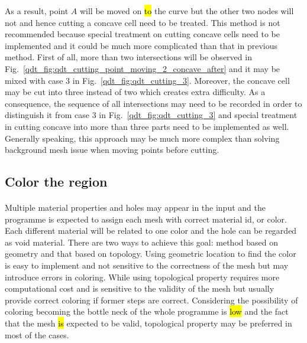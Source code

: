 As a result, point $A$ will be moved on \hl{to} the curve but the other two nodes will not and hence cutting a concave cell need to be treated.
This method is not recommended because special treatment on cutting concave cells need to be implemented and it could be much more complicated than that in previous method.
First of all, more than two intersections will be observed in Fig.~\ref{qdt_fig:qdt_cutting_point_moving_2_concave_after} and it may be mixed with case 3 in Fig.~\ref{qdt_fig:qdt_cutting_3}.
Moreover, the concave cell may be cut into three instead of two which creates extra difficulty.
As a consequence, the sequence of all intersections may need to be recorded in order to distinguish it from case 3 in Fig.~\ref{qdt_fig:qdt_cutting_3} and special treatment in cutting concave into more than three parts need to be implemented as well.
Generally speaking, this approach may be much more complex than solving background mesh issue when moving points before cutting.


% 
\subsection{Color the region}
\paragraph{}
Multiple material properties and holes may appear in the input and the programme is expected to assign each mesh with correct material id, or color.
Each different material will be related to one color and the hole can be regarded as void material.
There are two ways to achieve this goal: method based on geometry and that based on topology.
Using geometric location to find the color is easy to implement and not sensitive to the correctness of the mesh but may introduce errors in coloring.
While using topological property requires more computational cost and is sensitive to the validity of the mesh but usually provide correct coloring if former steps are correct.
Considering the possibility of coloring becoming the bottle neck of the whole programme is \hl{low} and the fact that the mesh \hl{is} expected to be valid, topological property may be preferred in most of the cases.

